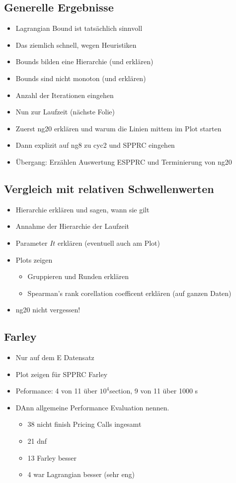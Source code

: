 \documentclass{article}
\begin{document}
\subsection*{Generelle Ergebnisse}
\begin{itemize}
    \item Lagrangian Bound ist tatsächlich sinnvoll
    \item Das ziemlich schnell, wegen Heuristiken
    \item Bounds bilden eine Hierarchie (und erklären)
    \item Bounds sind nicht monoton (und erklären)
    \item Anzahl der Iterationen eingehen
    \item Nun zur Laufzeit (nächste Folie)
    \item Zuerst ng20 erklären und warum die Linien mittem im Plot starten
    \item Dann explizit auf ng8 zu cyc2 und SPPRC eingehen
    \item Übergang: Erzählen Auswertung ESPPRC und Terminierung von ng20
\end{itemize}
\subsection*{Vergleich mit relativen Schwellenwerten}
\begin{itemize}
    \item Hierarchie erklären und sagen, wann sie gilt
    \item Annahme der Hierarchie der Laufzeit
    \item Parameter $It$ erklären (eventuell auch am Plot)
    \item Plots zeigen
    \begin{itemize}
        \item Gruppieren und Runden erklären
        \item Spearman's rank corellation coefficent erklären (auf ganzen Daten)
    \end{itemize}
    \item ng20 nicht vergessen!
\end{itemize}

\subsection*{Farley}
\begin{itemize}
    \item Nur auf dem E Datensatz
    \item Plot zeigen für SPPRC Farley
    \item Peformance: 4 von 11 über $10^4$section, 9 von 11 über 1000 s
    \item DAnn allgemeine Performance Evaluation nennen.
    \begin{itemize}
        \item 38 nicht finish Pricing Calls ingesamt
        \item 21 dnf
        \item 13 Farley besser
        \item 4 war Lagrangian besser (sehr eng)
    \end{itemize}
\end{itemize}
\end{document}
